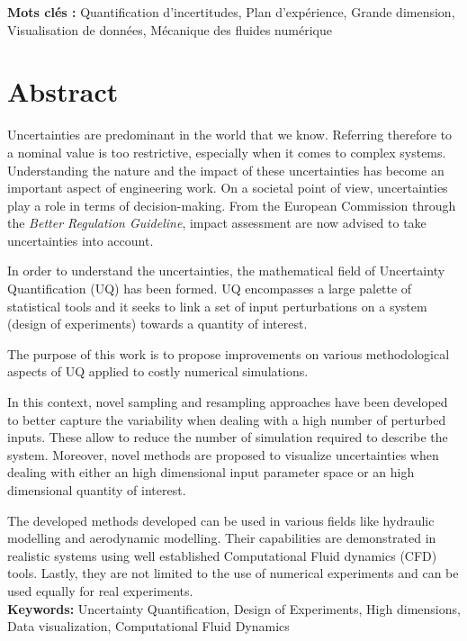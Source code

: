 \textbf{Mots clés :} Quantification d'incertitudes, Plan d'expérience, Grande dimension, Visualisation de données, Mécanique des fluides numérique %



\newpage
\section*{Abstract}

Uncertainties are predominant in the world that we know. Referring therefore to a nominal value is too restrictive, especially when it comes to complex systems. Understanding the nature and the impact of these uncertainties has become an important aspect of engineering work. On a societal point of view, uncertainties play a role in terms of decision-making. From the European Commission through the \emph{Better Regulation Guideline}, impact assessment are now advised to take uncertainties into account.

In order to understand the uncertainties, the mathematical field of Uncertainty Quantification (UQ) has been formed. UQ encompasses a large palette of statistical tools and it seeks to link a set of input perturbations on a system (design of experiments) towards a quantity of interest.

The purpose of this work is to propose improvements on various methodological aspects of UQ applied to costly numerical simulations. 


In this context, novel sampling and resampling approaches have been developed to better capture the variability when dealing with a high number of perturbed inputs. These allow to reduce the number of simulation required to describe the system. Moreover, novel methods are proposed to visualize uncertainties when dealing with either an high dimensional input parameter space or an high dimensional quantity of interest.

The developed methods developed can be used in various fields like hydraulic modelling and aerodynamic modelling. Their capabilities are demonstrated in realistic systems using well established Computational Fluid dynamics (CFD) tools. Lastly, they are not limited to the use of numerical experiments and can be used equally for real experiments.\\

\textbf{Keywords:} Uncertainty Quantification, Design of Experiments, High dimensions, Data visualization, Computational Fluid Dynamics %





